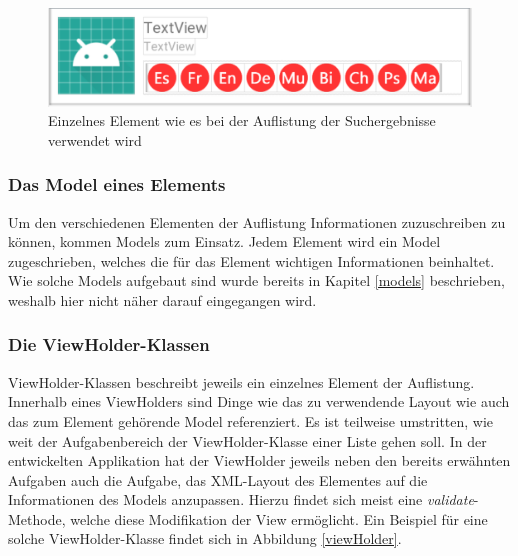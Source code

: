 \documentclass[../main.tex]{subfiles}
\begin{document}
	\begin{figure}
		\centering
		\includegraphics[width=\linewidth]{./images/Listelement.png}
		\caption{Einzelnes Element wie es bei der Auflistung der Suchergebnisse verwendet wird}
		\label{listElement}
	\end{figure}

	\subsubsection{Das Model eines Elements}
	Um den verschiedenen Elementen der Auflistung Informationen zuzuschreiben zu können, kommen Models zum Einsatz. Jedem Element wird ein Model zugeschrieben, welches die für das Element wichtigen Informationen beinhaltet. Wie solche Models aufgebaut sind wurde bereits in Kapitel \ref{models} beschrieben, weshalb hier nicht näher darauf eingegangen wird.
	
	\subsubsection{Die ViewHolder-Klassen}
	ViewHolder-Klassen beschreibt jeweils ein einzelnes Element der Auflistung. Innerhalb eines ViewHolders sind Dinge wie das zu verwendende Layout wie auch das zum Element gehörende Model referenziert. Es ist teilweise umstritten, wie weit der Aufgabenbereich der ViewHolder-Klasse einer Liste gehen soll. In der entwickelten Applikation hat der ViewHolder jeweils neben den bereits erwähnten Aufgaben auch die Aufgabe, das XML-Layout des Elementes auf die Informationen des Models anzupassen. Hierzu findet sich meist eine \emph{validate}-Methode, welche diese Modifikation der View ermöglicht. Ein Beispiel für eine solche ViewHolder-Klasse findet sich in Abbildung \ref{viewHolder}.
\end{document}
